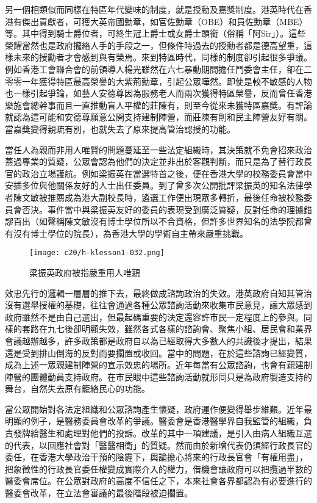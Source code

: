 另一個相類似而同樣在特區年代變味的制度，就是授勳及嘉獎制度。港英時代在香港有傑出貢獻者，可獲大英帝國勳章，如官佐勳章（OBE）和員佐勳章（MBE）等。其中得到騎士爵位者，可終生冠上爵士或女爵士頭銜（俗稱「阿Sir」）。這些榮耀當然也是政府攏絡人手的手段之一，但條件時過去的授勳者都是德高望重，這樣未來的授勳者才會感到與有榮焉。來到特區時代，同樣的制度卻引起很多爭議。例如香港工會聯合會的前領導人楊光雖然在六七暴動期間擔任鬥委會主任，卻在二零零一年獲得特區最高榮譽的大紫荊勳章，引起公眾嘩然。即使是較不敏感的人物也一樣引起爭論，如藝人安德尊因為服務老人而兩次獲得特區榮譽，反而曾任香港樂施會總幹事而且一直推動盲人平權的莊陳有，則至今從來未獲特區嘉獎。有評論就認為這可能和安德尊願意公開支持建制陣營，而莊陳有則和民主陣營友好有關。當嘉獎變得親疏有別，也就失去了原來提高管治認授的功能。

當任人為親而非用人唯賢的問題蔓延至一些法定組織時，其決策就不免會招來政治蓋過專業的質疑，公眾會認為他們的決定並非出於客觀判斷，而只是為了替行政長官的政治立場護航。例如梁振英在當選特首之後，便在香港大學的校務委員會當中安插多位與他關係友好的人士出任委員。到了曾多次公開批評梁振英的知名法律學者陳文敏被推薦成為港大副校長時，遴選工作便出現眾多轉折，最後任命被校務委員會否決。事件當中與梁振英友好的委員的表現受到廣泛質疑，反對任命的理據錯謬百出（如聲稱陳文敏沒有博士學位所以不合資格，但許多世界知名的法學院都曾有沒有博士學位的院長），為香港大學的學術自主帶來嚴重挑戰。

\begin{figure}[htbp]
    \centering
    \texttt{[image: c20/h-klesson1-032.png]}
    \caption{梁振英政府被指嚴重用人唯親} 
\end{figure}

效忠先行的邏輯一層層的推下去，最終做成諮詢政治的失效。港英政府自知其管治沒有選舉授權的基礎，往往會通過各種公眾諮詢活動來收集市民意見，讓大眾感到政府雖然不是由自己選出，但最起碼重要的決定還容許市民一定程度上的參與。同樣的套路在九七後卻明顯失效，雖然各式各樣的諮詢會、聚焦小組、居民會和業界會議越辦越多，許多政策都是政府自以為已經取得大多數人的共識後才提出，結果還是受到排山倒海的反對而要擱置或收回。當中的問題，在於這些諮詢已經變質，成為上述一眾親建制陣營的宣示效忠的場所。近年每當有公眾諮詢，也會有親建制陣營的團體動員支持政府。在市民眼中這些諮詢活動就形同只是為政府製造支持的舞台，自然失去原有籠絡民心的功能。

當公眾開始對各法定組織和公眾諮詢產生懷疑，政府運作便變得舉步維艱。近年最明顯的例子，是醫務委員會改革的爭議。醫委會是香港醫學界自我監管的組織，負責發牌給醫生和處理對他們的投訴。改革的其中一項建議，是引入由病人組織互選的代表，以回應社會對「醫醫相衛」的質疑。然而由於新增代表仍須經行政長官的委任，在香港大學政治干預的陰霾下，輿論擔心將來的行政長官會「有權用盡」，把象徵性的行政長官委任權變成實際介入的權力，借機會讓政府可以把攬過半數的醫委會席位。在公眾對政府的高度不信任之下，本來社會各界都認為有必要進行的醫委會改革，在立法會審議的最後階段被迫擱置。

